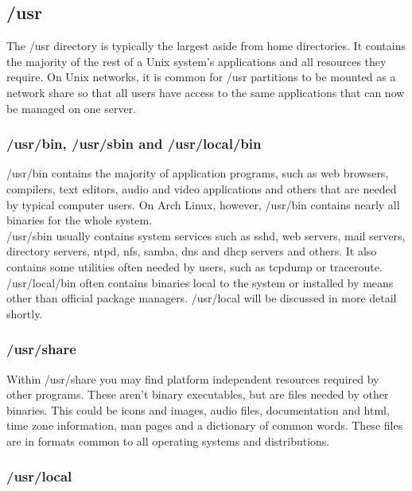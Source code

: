\subsection{/usr}

The /usr directory is typically the largest aside from home directories.  It contains the majority of the rest of a Unix system's applications and all resources they require.  On Unix networks, it is common for /usr partitions to be mounted as a network share so that all users have access to the same applications that can now be managed on one server.

\subsubsection{/usr/bin, /usr/sbin and /usr/local/bin}

/usr/bin contains the majority of application programs, such as web browsers, compilers, text editors, audio and video applications and others that are needed by typical computer users.  On Arch Linux, however, /usr/bin contains nearly all binaries for the whole system.\\

/usr/sbin usually contains system services such as sshd, web servers, mail servers, directory servers, ntpd, nfs, samba, dns and dhcp servers and others.  It also contains some utilities often needed by users, such as tcpdump or traceroute.\\

/usr/local/bin often contains binaries local to the system or installed by means other than official package managers.  /usr/local will be discussed in more detail shortly.

\subsubsection{/usr/share}

Within /usr/share you may find platform independent resources required by other programs.  These aren't binary executables, but are files needed by other binaries.  This could be icons and images, audio files, documentation and html, time zone information, man pages and a dictionary of common words.  These files are in formats common to all operating systems and distributions.

\subsubsection{/usr/local}

